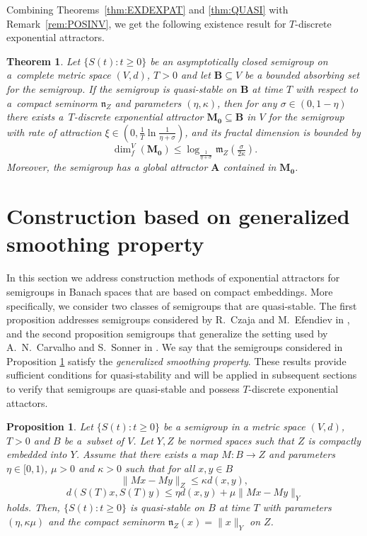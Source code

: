 \documentclass[a4paper,12pt,reqno]{amsart}
\theoremstyle{plain}
\newtheorem{thm}[lem]{Theorem}
\newtheorem{prop}[lem]{Proposition}
\theoremstyle{definition}
\numberwithin{equation}{section}
\newcommand{\dimf}{\operatorname{dim}_{f}}
\renewcommand{\geq}{\geqslant}
\renewcommand{\leq}{\leqslant}
\begin{document}
Combining Theorems~\ref{thm:EXDEXPAT} and \ref{thm:QUASI} with Remark~\ref{rem:POSINV}, we get the following existence result for $T$-discrete exponential attractors.

\begin{thm}
Let $\{S(t)\colon t\geq 0\}$ be an asymptotically closed semigroup on a~complete metric space $(V,d)$, $T>0$ and let $\mathbf{B}\subseteq V$ be a bounded absorbing set for the semigroup. If the semigroup is quasi-stable on $\mathbf{B}$ at time $T$ with respect to a~compact seminorm $\mathfrak{n}_{Z}$ and parameters $(\eta,\kappa)$, then for any $\sigma\in(0,1-\eta)$ there exists a~$T$-discrete exponential attractor $\mathbf{M_0}\subseteq\mathbf{B}$ in $V$ for the semigroup with rate of attraction $\xi\in(0,\frac{1}{T}\ln{\frac{1}{\eta+\sigma}})$, and its fractal dimension is bounded by
\begin{equation*}
\dimf^{V}(\mathbf{M_0})\leq\log_{\frac{1}{\eta+\sigma}}\mathfrak{m}_{Z}\left(\tfrac{\sigma}{2\kappa}\right).
\end{equation*}
Moreover, the semigroup has a global attractor $\mathbf{A}$  contained in $\mathbf{M_0}$.
\end{thm}

\section{Construction based on generalized smoothing property}\label{sec:CE}

In this section we address construction methods of exponential attractors for semigroups in Banach 
spaces that are based on compact embeddings. More specifically, we consider two classes of semigroups that are quasi-stable. 
The first proposition addresses semigroups considered by R.~Czaja and M.~Efendiev in \cite[Theorem 3.2]{CzEf}, and the second proposition semigroups that generalize the setting used by A.~N.~Carvalho and S.~Sonner in \cite{CaSo}. 
We say that the semigroups considered in Proposition \ref{prop:czaja} satisfy the \emph{generalized smoothing property}. 
These results provide sufficient conditions for quasi-stability and will be applied in subsequent sections to verify that semigroups are quasi-stable and possess $T$-discrete exponential attactors. 

\begin{prop}\label{prop:czaja}
Let $\{S(t)\colon t\geq 0\}$ be a semigroup in a metric space $(V,d)$, $T>0$ and $B$ be a~subset of $V$. 
Let $Y,Z$ be normed spaces such that $Z$ is compactly embedded into $Y$. Assume that there exists a map $M\colon B\to Z$ and parameters $\eta\in[0,1)$, $\mu>0$ and $\kappa>0$ such that for all $x,y\in B$
\begin{equation}\label{e:CZAJA1}
\|Mx-My\|_Z\leq \kappa d(x,y),
\end{equation}
\begin{equation}\label{e:CZAJA2}
d(S(T)x,S(T)y)\leq \eta d(x,y)+\mu\|Mx-My\|_Y
\end{equation} 
holds. Then, $\{S(t)\colon t\geq 0\}$ is quasi-stable on $B$ at time $T$ with parameters $(\eta,\kappa\mu)$ and the compact seminorm $\mathfrak{n}_{Z}(x)=\|x\|_Y$ on $Z$.
\end{prop}
\end{document}
